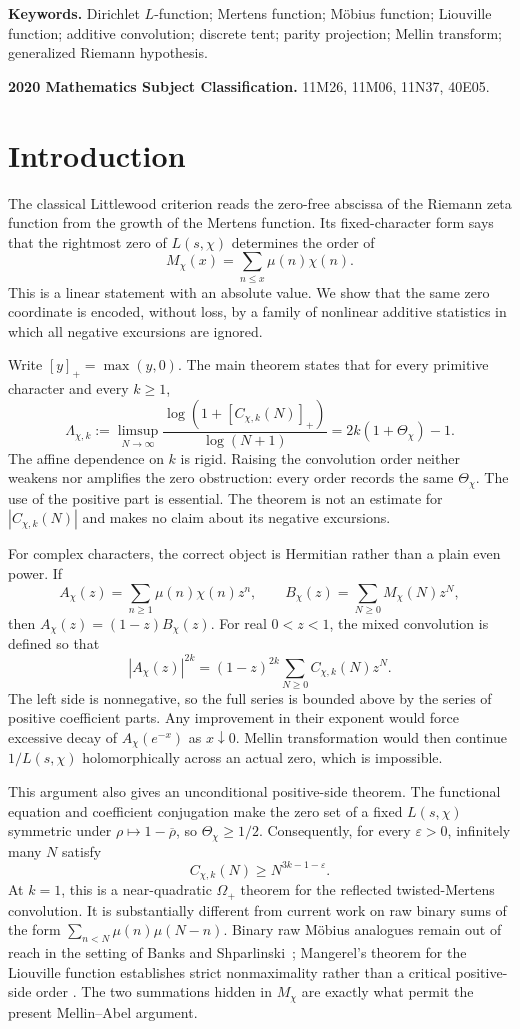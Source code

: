 \documentclass[11pt]{article}
\theoremstyle{remark}
\newcommand{\eps}{\varepsilon}
\begin{document}
\medskip
\noindent\textbf{Keywords.} Dirichlet $L$-function; Mertens function; M\"obius function;
Liouville function; additive convolution; discrete tent; parity projection; Mellin transform; generalized
Riemann hypothesis.

\medskip
\noindent\textbf{2020 Mathematics Subject Classification.} 11M26, 11M06, 11N37, 40E05.

\section{Introduction}

The classical Littlewood criterion reads the zero-free abscissa of the Riemann zeta function
from the growth of the Mertens function.  Its fixed-character form says that the rightmost zero
of $L(s,\chi)$ determines the order of
\[
 M_\chi(x)=\sum_{n\leq x}\mu(n)\chi(n).
\]
This is a linear statement with an absolute value.  We show that the same zero coordinate is
encoded, without loss, by a family of nonlinear additive statistics in which all negative
excursions are ignored.

Write $[y]_+=\max(y,0)$.  The main theorem states that for every primitive character and every
$k\geq1$,
\[
 \Lambda_{\chi,k}:=\limsup_{N\to\infty}
 \frac{\log(1+[C_{\chi,k}(N)]_+)}{\log(N+1)}
 =2k(1+\Theta_\chi)-1.
\]
The affine dependence on $k$ is rigid.  Raising the convolution order neither weakens nor
amplifies the zero obstruction: every order records the same $\Theta_\chi$.  The use of the
positive part is essential.  The theorem is not an estimate for $|C_{\chi,k}(N)|$ and makes no
claim about its negative excursions.

For complex characters, the correct object is Hermitian rather than a plain even power.  If
\[
 A_\chi(z)=\sum_{n\geq1}\mu(n)\chi(n)z^n,
 \qquad
 B_\chi(z)=\sum_{N\geq0}M_\chi(N)z^N,
\]
then $A_\chi(z)=(1-z)B_\chi(z)$.  For real $0<z<1$, the mixed convolution is defined so that
\[
 |A_\chi(z)|^{2k}
 =(1-z)^{2k}\sum_{N\geq0}C_{\chi,k}(N)z^N.
\]
The left side is nonnegative, so the full series is bounded above by the series of positive
coefficient parts.  Any improvement in their exponent would force excessive decay of
$A_\chi(e^{-x})$ as $x\downarrow0$.  Mellin transformation would then continue
$1/L(s,\chi)$ holomorphically across an actual zero, which is impossible.

This argument also gives an unconditional positive-side theorem.  The functional equation and
coefficient conjugation make the zero set of a fixed $L(s,\chi)$ symmetric under
$\rho\mapsto1-\overline\rho$, so $\Theta_\chi\geq1/2$.  Consequently, for every $\eps>0$,
infinitely many $N$ satisfy
\[
 C_{\chi,k}(N)\geq N^{3k-1-\eps}.
\]
At $k=1$, this is a near-quadratic $\Omega_+$ theorem for the reflected twisted-Mertens
convolution.  It is substantially different from current work on raw binary sums of the form
$\sum_{n<N}\mu(n)\mu(N-n)$.  Binary raw Möbius analogues remain out of reach in the setting of
Banks and Shparlinski~\cite{BanksShparlinski}; Mangerel's theorem for the Liouville function
establishes strict nonmaximality rather than a critical positive-side order
\cite{Mangerel}.  The two summations hidden in $M_\chi$ are exactly what permit the present
Mellin--Abel argument.
\end{document}
